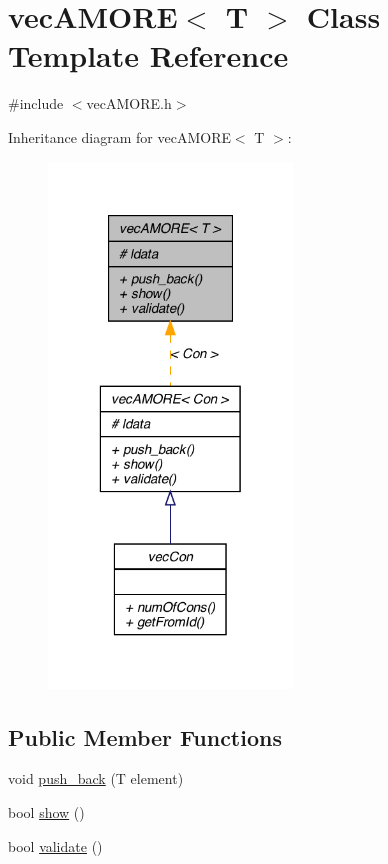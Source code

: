 \hypertarget{classvec_a_m_o_r_e}{
\section{vecAMORE$<$ T $>$ Class Template Reference}
\label{classvec_a_m_o_r_e}
}


{\ttfamily \#include $<$vecAMORE.h$>$}



Inheritance diagram for vecAMORE$<$ T $>$:
\nopagebreak
\begin{figure}[H]
\begin{center}
\leavevmode
\includegraphics[width=184pt]{classvec_a_m_o_r_e__inherit__graph}
\end{center}
\end{figure}
\subsection*{Public Member Functions}
\begin{DoxyCompactItemize}
\item 
void \hyperlink{classvec_a_m_o_r_e_a2472d46a111328c069cdb48e7e41109b}{push\_\-back} (T element)
\item 
bool \hyperlink{classvec_a_m_o_r_e_a11b0ffb0d2481f1960cb49a26b227d37}{show} ()
\item 
bool \hyperlink{classvec_a_m_o_r_e_a247aaafe9115cc433fc3be297c1f568e}{validate} ()
\end{DoxyCompactItemize}
